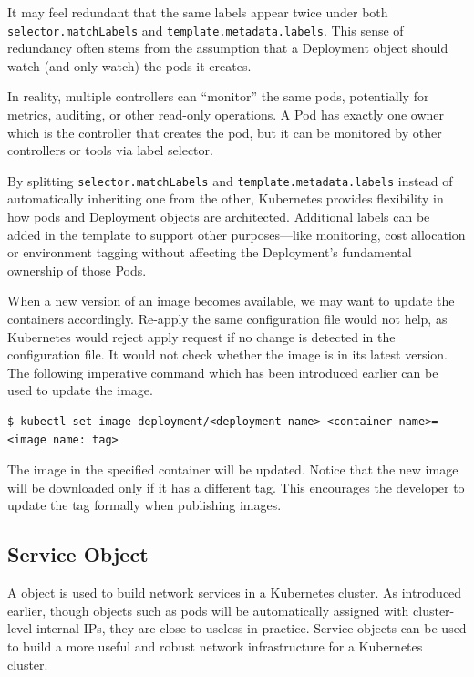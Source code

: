 \begin{shortbox}

It may feel redundant that the same labels appear twice under both \texttt{selector.matchLabels} and \texttt{template.metadata.labels}. This sense of redundancy often stems from the assumption that a Deployment object should watch (and only watch) the pods it creates.

In reality, multiple controllers can ``monitor'' the same pods, potentially for metrics, auditing, or other read-only operations. A Pod has exactly one owner which is the controller that creates the pod, but it can be monitored by other controllers or tools via label selector.

By splitting \texttt{selector.matchLabels} and \texttt{template.metadata.labels} instead of automatically inheriting one from the other, Kubernetes provides flexibility in how pods and Deployment objects are architected. Additional labels can be added in the template to support other purposes—like monitoring, cost allocation or environment tagging without affecting the Deployment’s fundamental ownership of those Pods.

\end{shortbox}

When a new version of an image becomes available, we may want to update the containers accordingly. Re-apply the same configuration file would not help, as Kubernetes would reject apply request if no change is detected in the configuration file. It would not check whether the image is in its latest version. The following imperative command which has been introduced earlier can be used to update the image.
\begin{lstlisting}
$ kubectl set image deployment/<deployment name> <container name>=<image name: tag>
\end{lstlisting}
The image in the specified container will be updated. Notice that the new image will be downloaded only if it has a different tag. This encourages the developer to update the tag formally when publishing images.

\subsection{Service Object} \label{ch:vac:subsec:k8snetworking}

A  object is used to build network services in a Kubernetes cluster. As introduced earlier, though objects such as pods will be automatically assigned with cluster-level internal IPs, they are close to useless in practice. Service objects can be used to build a more useful and robust network infrastructure for a Kubernetes cluster.

